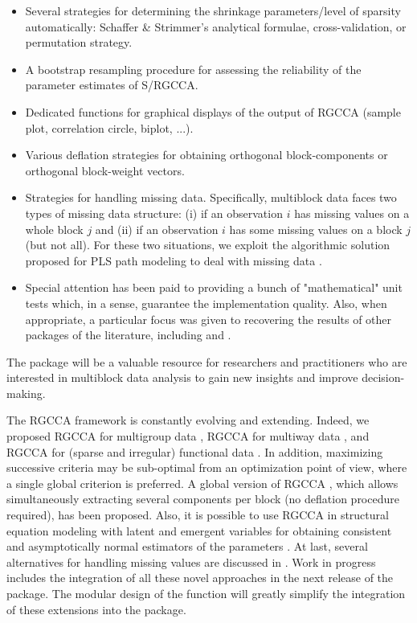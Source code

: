 \documentclass[
]{jss}
\begin{document}
\begin{itemize}
\item Several strategies for determining the shrinkage parameters/level of sparsity automatically: Schaffer \& Strimmer's analytical formulae, cross-validation, or permutation strategy.

\item A bootstrap resampling procedure for assessing the reliability of the parameter estimates of S/RGCCA.

\item Dedicated functions for graphical displays of the output of RGCCA (sample plot, correlation circle, biplot, ...).

\item Various deflation strategies for obtaining orthogonal block-components or orthogonal block-weight vectors.


\item Strategies for handling missing data. Specifically, multiblock data faces two types of missing data structure: (i) if an observation $i$ has missing values on a whole block $j$ and (ii) if an observation $i$ has some missing values on a block $j$ (but not all). For these two situations, we exploit the algorithmic solution proposed for PLS path modeling to deal with missing data \citep[see][]{Tenenhaus2005}.

\item Special attention has been paid to providing a bunch of "mathematical" unit tests which, in a sense, guarantee the implementation quality. Also, when appropriate, a particular focus was given to recovering the results of other  packages of the literature, including  and .
\end{itemize}

The  package will be a valuable resource for researchers and
practitioners who are interested in multiblock data analysis to gain new
insights and improve decision-making.

The RGCCA framework is constantly evolving and extending. Indeed, we
proposed RGCCA for multigroup data \citep{Tenenhaus2014b}, RGCCA for
multiway data \citep{Gloaguen2020, Girka2023}, and RGCCA for (sparse and
irregular) functional data \citep{Sort2023}. In addition, maximizing
successive criteria may be sub-optimal from an optimization point of
view, where a single global criterion is preferred. A global version of
RGCCA \citep{Gloaguen2020b}, which allows simultaneously extracting
several components per block (no deflation procedure required), has been
proposed. Also, it is possible to use RGCCA in structural equation
modeling with latent and emergent variables for obtaining consistent and
asymptotically normal estimators of the parameters
\citep{Tenenhaus2023}. At last, several alternatives for handling
missing values are discussed in \cite{Peltier2022}. Work in progress
includes the integration of all these novel approaches in the next
release of the  package. The modular design of the
 function will greatly simplify the integration of these
extensions into the package.
\end{document}
